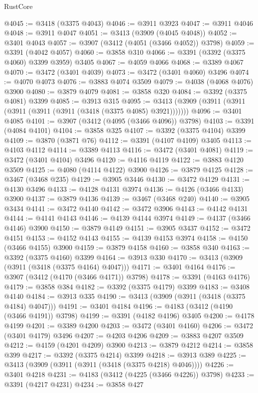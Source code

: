 \begin{lexlean}{RustCore}
\begin{coremodule}
@4045 := @3418 (@3375 @4043)
@4046 := @3911 @3923
@4047 := @3911 @4046
@4048 := @3911 @4047
@4051 := @3413 (@3909 (@4045 @4048))
@4052 := @3401 @4043
@4057 := @3907 (@3412 (@4051 (@3466 @4052)) @3798)
@4059 := @3391 (@4042 @4057)
@4060 := @3858 @310
@4066 := @3391 (@3392 (@3375 @4060) @3399 @3959) @3405
@4067 := @4059 @4066
@4068 := @3389 @4067
@4070 := @3472 (@3401 @4039)
@4073 := @3472 (@3401 @4060) @3496
@4074 := @4070 @4073
@4076 := @3883 @4074 @3509
@4079 := @4038 (@4068 @4076) @3900
@4080 := @3879 @4079
@4081 := @3858 @320
@4084 := @3392 (@3375 @4081) @3399
@4085 := @3913 @315
@4095 := @3413 (@3909 (@3911 (@3911 (@3911 (@3911 (@3911 (@3418 (@3375 @4085) @3921)))))))
@4096 := @3401 @4085
@4101 := @3907 (@3412 (@4095 (@3466 @4096)) @3798)
@4103 := @3391 (@4084 @4101)
@4104 := @3858 @325
@4107 := @3392 (@3375 @4104) @3399
@4109 := @3870 (@3871 @76)
@4112 := @3391 (@4107 @4109) @3405
@4113 := @4103 @4112
@4114 := @3389 @4113
@4116 := @3472 (@3401 @4081)
@4119 := @3472 (@3401 @4104) @3496
@4120 := @4116 @4119
@4122 := @3883 @4120 @3509
@4125 := @4080 (@4114 @4122) @3900
@4126 := @3879 @4125
@4128 := @3467 (@3468 @235)
@4129 := @3905 @3446
@4130 := @3472 @4129
@4131 := @4130 @3496
@4133 := @4128 @4131 @3974
@4136 := @4126 (@3466 @4133) @3900
@4137 := @3879 @4136
@4139 := @3467 (@3468 @240)
@4140 := @3905 @3434
@4141 := @3472 @4140
@4142 := @3472 @3906
@4143 := @4142 @4131
@4144 := @4141 @4143
@4146 := @4139 @4144 @3974
@4149 := @4137 (@3466 @4146) @3900
@4150 := @3879 @4149
@4151 := @3905 @3437
@4152 := @3472 @4151
@4153 := @4152 @4143
@4155 := @4139 @4153 @3974
@4158 := @4150 (@3466 @4155) @3900
@4159 := @3879 @4158
@4160 := @3858 @340
@4163 := @3392 (@3375 @4160) @3399
@4164 := @3913 @330
@4170 := @3413 (@3909 (@3911 (@3418 (@3375 @4164) @4047)))
@4171 := @3401 @4164
@4176 := @3907 (@3412 (@4170 (@3466 @4171)) @3798)
@4178 := @3391 (@4163 @4176)
@4179 := @3858 @384
@4182 := @3392 (@3375 @4179) @3399
@4183 := @3408 @4140
@4184 := @3913 @335
@4190 := @3413 (@3909 (@3911 (@3418 (@3375 @4184) @4047)))
@4191 := @3401 @4184
@4196 := @4183 (@3412 (@4190 (@3466 @4191)) @3798)
@4199 := @3391 (@4182 @4196) @3405
@4200 := @4178 @4199
@4201 := @3389 @4200
@4203 := @3472 (@3401 @4160)
@4206 := @3472 (@3401 @4179) @3496
@4207 := @4203 @4206
@4209 := @3883 @4207 @3509
@4212 := @4159 (@4201 @4209) @3900
@4213 := @3879 @4212
@4214 := @3858 @399
@4217 := @3392 (@3375 @4214) @3399
@4218 := @3913 @389
@4225 := @3413 (@3909 (@3911 (@3911 (@3418 (@3375 @4218) @4046))))
@4226 := @3401 @4218
@4231 := @4183 (@3412 (@4225 (@3466 @4226)) @3798)
@4233 := @3391 (@4217 @4231)
@4234 := @3858 @427

\end{coremodule}
\end{lexlean}
